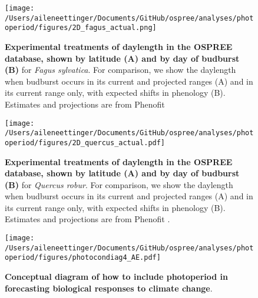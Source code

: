 \documentclass{article}
\begin{document}
 
\begin{figure}[p]
\texttt{[image: /Users/aileneettinger/Documents/GitHub/ospree/analyses/photoperiod/figures/2D\_fagus\_actual.png]} 
\caption{\textbf{Experimental treatments of daylength in the OSPREE database, shown by latitude (A) and by day of budburst (B)} for \textit{Fagus sylvatica}. For comparison, we show the daylength when budburst occurs in its current and projected ranges (A) and in its current range only, with expected shifts in phenology (B). Estimates and projections are from Phenofit \citep{duputie2015}}
 \label{fig:fagus}
 \end{figure}
 
\begin{figure}[p]
\texttt{[image: /Users/aileneettinger/Documents/GitHub/ospree/analyses/photoperiod/figures/2D\_quercus\_actual.pdf]} 
\caption{\textbf{Experimental treatments of daylength in the OSPREE database, shown by latitude (A) and by day of budburst (B)} for \textit{Quercus robur}. For comparison, we show the daylength when budburst occurs in its current and projected ranges (A) and in its current range only, with expected shifts in phenology (B). Estimates and projections are from Phenofit \citep{duputie2015}.}
 \label{fig:quercus}
 \end{figure}
 
\begin{figure}[p]
\texttt{[image: /Users/aileneettinger/Documents/GitHub/ospree/analyses/photoperiod/figures/photocondiag4\_AE.pdf]} 
\caption{\textbf{Conceptual diagram of how to include photoperiod in forecasting biological responses to climate change}.}
 \label{fig:condiag}
 \end{figure}

\end{document}
